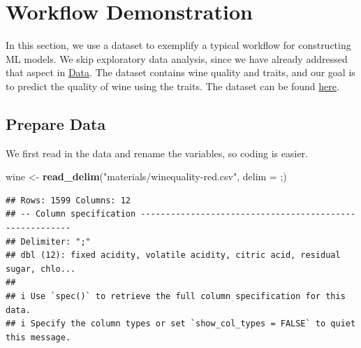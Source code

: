 \documentclass[
]{book}
\newenvironment{Shaded}{\begin{snugshade}}{\end{snugshade}}
\newcommand{\AttributeTok}[1]{\textcolor[rgb]{0.13,0.29,0.53}{#1}}
\newcommand{\ConstantTok}[1]{\textcolor[rgb]{0.56,0.35,0.01}{#1}}
\newcommand{\FunctionTok}[1]{\textcolor[rgb]{0.13,0.29,0.53}{\textbf{#1}}}
\newcommand{\NormalTok}[1]{#1}
\newcommand{\OtherTok}[1]{\textcolor[rgb]{0.56,0.35,0.01}{#1}}
\newcommand{\SpecialCharTok}[1]{\textcolor[rgb]{0.81,0.36,0.00}{\textbf{#1}}}
\newcommand{\StringTok}[1]{\textcolor[rgb]{0.31,0.60,0.02}{#1}}
\begin{document}
\hypertarget{workflow-demonstration}{%
\chapter{Workflow Demonstration}\label{workflow-demonstration}}

In this section, we use a dataset to exemplify a typical workflow for constructing ML models. We skip exploratory data analysis, since we have already addressed that aspect in \protect\hyperlink{data}{Data}. The dataset contains wine quality and traits, and our goal is to predict the quality of wine using the traits. The dataset can be found \href{https://www.kaggle.com/datasets/yasserh/wine-quality-dataset}{here}.

\begin{Shaded}
\end{Shaded}

\hypertarget{prepare-data}{%
\section{Prepare Data}\label{prepare-data}}

We first read in the data and rename the variables, so coding is easier.

\begin{Shaded}
\begin{Highlighting}[]
\NormalTok{wine }\OtherTok{\textless{}{-}} \FunctionTok{read\_delim}\NormalTok{(}\StringTok{"materials/winequality{-}red.csv"}\NormalTok{, }\AttributeTok{delim =} \StringTok{\textquotesingle{};\textquotesingle{}}\NormalTok{)}
\end{Highlighting}
\end{Shaded}

\begin{verbatim}
## Rows: 1599 Columns: 12
## -- Column specification --------------------------------------------------------
## Delimiter: ";"
## dbl (12): fixed acidity, volatile acidity, citric acid, residual sugar, chlo...
## 
## i Use `spec()` to retrieve the full column specification for this data.
## i Specify the column types or set `show_col_types = FALSE` to quiet this message.
\end{verbatim}
\end{document}
